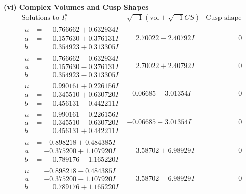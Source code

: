 \documentclass[1p]{elsarticle_modified}
\theoremstyle{definition}
\newcommand{\I}{\sqrt{-1}}
\begin{document}
\newpage\flushleft \textbf{(vi) Complex Volumes and Cusp Shapes}
$$\begin{array}{c|c|c}  
\text{Solutions to }I^u_{1}& \I (\text{vol} + \sqrt{-1}CS) & \text{Cusp shape}\\
 \hline 
\begin{aligned}
u &= \phantom{-}0.766662 + 0.632934 I \\
a &= \phantom{-}0.157630 + 0.376131 I \\
b &= \phantom{-}0.354923 + 0.313305 I\end{aligned}
 & \phantom{-}2.70022 - 2.40792 I & \phantom{-0.000000 } 0 \\ \hline\begin{aligned}
u &= \phantom{-}0.766662 - 0.632934 I \\
a &= \phantom{-}0.157630 - 0.376131 I \\
b &= \phantom{-}0.354923 - 0.313305 I\end{aligned}
 & \phantom{-}2.70022 + 2.40792 I & \phantom{-0.000000 } 0 \\ \hline\begin{aligned}
u &= \phantom{-}0.990161 + 0.226156 I \\
a &= \phantom{-}0.345510 + 0.630720 I \\
b &= \phantom{-}0.456131 - 0.442211 I\end{aligned}
 & -0.06685 - 3.01354 I & \phantom{-0.000000 } 0 \\ \hline\begin{aligned}
u &= \phantom{-}0.990161 - 0.226156 I \\
a &= \phantom{-}0.345510 - 0.630720 I \\
b &= \phantom{-}0.456131 + 0.442211 I\end{aligned}
 & -0.06685 + 3.01354 I & \phantom{-0.000000 } 0 \\ \hline\begin{aligned}
u &= -0.898218 + 0.484385 I \\
a &= -0.375200 + 1.107920 I \\
b &= \phantom{-}0.789176 - 1.165220 I\end{aligned}
 & \phantom{-}3.58702 + 6.98929 I & \phantom{-0.000000 } 0 \\ \hline\begin{aligned}
u &= -0.898218 - 0.484385 I \\
a &= -0.375200 - 1.107920 I \\
b &= \phantom{-}0.789176 + 1.165220 I\end{aligned}
 & \phantom{-}3.58702 - 6.98929 I & \phantom{-0.000000 } 0 \\ \hline\begin{aligned}

\end{aligned}
\end{array}$$
\end{document}
